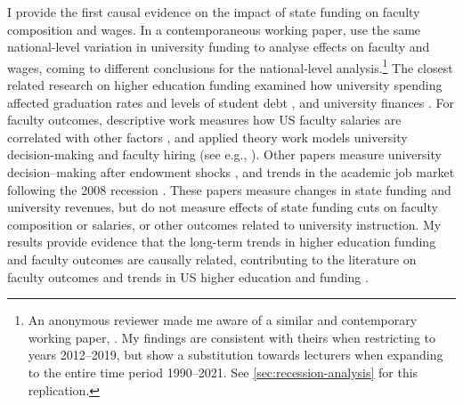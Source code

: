 I provide the first causal evidence on the impact of state funding on faculty composition and wages.
In a contemporaneous working paper, \cite{hinrichs2022state} use the same national-level variation in university funding to analyse effects on faculty and wages, coming to different conclusions for the national-level analysis.\footnote{
    An anonymous reviewer made me aware of a similar and contemporary working paper, \cite{hinrichs2022state}.
    My findings are consistent with theirs when restricting to years 2012--2019, but show a substitution towards lecturers when expanding to the entire time period 1990--2021.
    See \autoref{sec:recession-analysis} for this replication.
}
The closest related research on higher education funding examined how university spending affected graduation rates and levels of student debt \citep{NBERw23736,NBERw27885}, and university finances \citep{miller2022making,bound2019public,webber2017state}.
For faculty outcomes, descriptive work measures how US faculty salaries are correlated with other factors \citep{hilmer2020labor}, and applied theory work models university decision-making and faculty hiring (see e.g., \citealt{abe2015implications,johnson2009jep,NBERc13879}).
Other papers measure university decision--making after endowment shocks \citep{brown2014endowment}, and trends in the academic job market following the 2008 recession \citep{turner2014impact}.
These papers measure changes in state funding and university revenues, but do not measure effects of state funding cuts on faculty composition or salaries, or other outcomes related to university instruction.
My results provide evidence that the long-term trends in higher education funding and faculty outcomes are causally related, contributing to the literature on faculty outcomes \citep{ehrenberg2003studying} and trends in US higher education and funding \citep{hoxby2009changing,ehrenberg2012american}.

